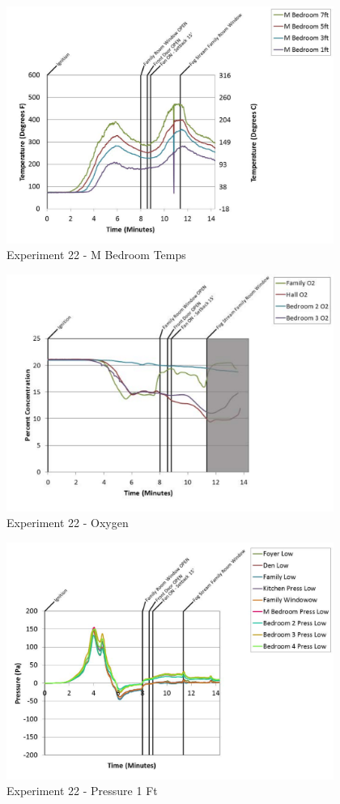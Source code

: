 \documentclass{article}
\begin{document}
\begin{appendices}
	\begin{figure}[h!]
		\centering
		\includegraphics[height=3.05in]{0_Images/Results_Charts/Exp_22_Charts/MBedroomTemps.pdf}
		\caption{Experiment 22 - M Bedroom Temps}
	\end{figure}
 
	\clearpage

	\begin{figure}[h!]
		\centering
		\includegraphics[height=3.05in]{0_Images/Results_Charts/Exp_22_Charts/Oxygen.pdf}
		\caption{Experiment 22 - Oxygen}
	\end{figure}
 

	\begin{figure}[h!]
		\centering
		\includegraphics[height=3.05in]{0_Images/Results_Charts/Exp_22_Charts/Pressure1Ft.pdf}
		\caption{Experiment 22 - Pressure 1 Ft}
	\end{figure}
 

\end{appendices}
\end{document}
